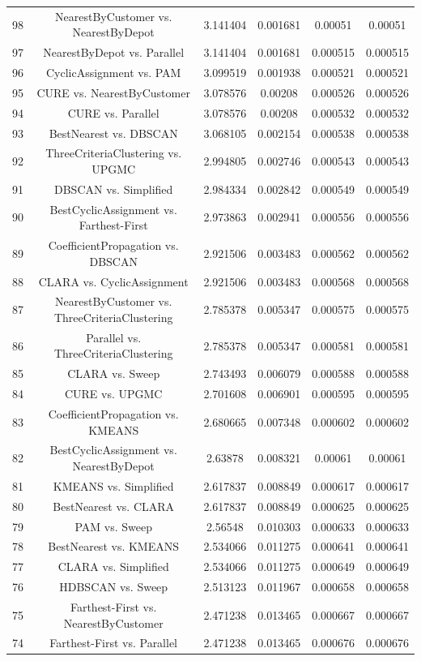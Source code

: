 \documentclass[a4paper,10pt]{article}
\begin{document}
\begin{landscape}
\begin{table}[!htp]
\begin{tabular}{cccccc}
98&NearestByCustomer vs. NearestByDepot&3.141404&0.001681&0.00051&0.00051\\
97&NearestByDepot vs. Parallel&3.141404&0.001681&0.000515&0.000515\\
96&CyclicAssignment vs. PAM&3.099519&0.001938&0.000521&0.000521\\
95&CURE vs. NearestByCustomer&3.078576&0.00208&0.000526&0.000526\\
94&CURE vs. Parallel&3.078576&0.00208&0.000532&0.000532\\
93&BestNearest vs. DBSCAN&3.068105&0.002154&0.000538&0.000538\\
92&ThreeCriteriaClustering vs. UPGMC&2.994805&0.002746&0.000543&0.000543\\
91&DBSCAN vs. Simplified&2.984334&0.002842&0.000549&0.000549\\
90&BestCyclicAssignment vs. Farthest-First&2.973863&0.002941&0.000556&0.000556\\
89&CoefficientPropagation vs. DBSCAN&2.921506&0.003483&0.000562&0.000562\\
88&CLARA vs. CyclicAssignment&2.921506&0.003483&0.000568&0.000568\\
87&NearestByCustomer vs. ThreeCriteriaClustering&2.785378&0.005347&0.000575&0.000575\\
86&Parallel vs. ThreeCriteriaClustering&2.785378&0.005347&0.000581&0.000581\\
85&CLARA vs. Sweep&2.743493&0.006079&0.000588&0.000588\\
84&CURE vs. UPGMC&2.701608&0.006901&0.000595&0.000595\\
83&CoefficientPropagation vs. KMEANS&2.680665&0.007348&0.000602&0.000602\\
82&BestCyclicAssignment vs. NearestByDepot&2.63878&0.008321&0.00061&0.00061\\
81&KMEANS vs. Simplified&2.617837&0.008849&0.000617&0.000617\\
80&BestNearest vs. CLARA&2.617837&0.008849&0.000625&0.000625\\
79&PAM vs. Sweep&2.56548&0.010303&0.000633&0.000633\\
78&BestNearest vs. KMEANS&2.534066&0.011275&0.000641&0.000641\\
77&CLARA vs. Simplified&2.534066&0.011275&0.000649&0.000649\\
76&HDBSCAN vs. Sweep&2.513123&0.011967&0.000658&0.000658\\
75&Farthest-First vs. NearestByCustomer&2.471238&0.013465&0.000667&0.000667\\
74&Farthest-First vs. Parallel&2.471238&0.013465&0.000676&0.000676\\

\end{tabular}
\end{table}
\end{landscape}
\end{document}
